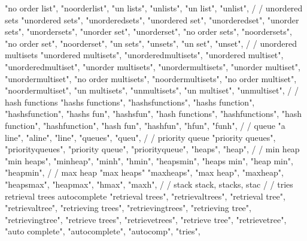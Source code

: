         "no order list", 
        "noorderlist", 
        "un lists", 
        "unlists", 
        "un list", 
        "unlist", 
        /
        / unordered sets
        "unordered sets", 
        "unorderedsets", 
        "unordered set", 
        "unorderedset", 
        "unorder sets", 
        "unordersets", 
        "unorder set", 
        "unorderset", 
        "no order sets", 
        "noordersets", 
        "no order set", 
        "noorderset", 
        "un sets", 
        "unsets", 
        "un set", 
        "unset", 
        /
        / unordered multisets
        "unordered multisets", 
        "unorderedmultisets", 
        "unordered multiset", 
        "unorderedmultiset", 
        "unorder multisets", 
        "unordermultisets", 
        "unorder multiset", 
        "unordermultiset", 
        "no order multisets", 
        "noordermultisets", 
        "no order multiset", 
        "noordermultiset", 
        "un multisets", 
        "unmultisets", 
        "un multiset", 
        "unmultiset", 
        /
        / hash functions
        "hashs functions",  
        "hashsfunctions",  
        "hashs function",  
        "hashsfunction",  
        "hashs fun",  
        "hashsfun",  
        "hash functions",  
        "hashfunctions",  
        "hash function",  
        "hashfunction",  
        "hash fun",  
        "hashfun",  
        "hfun",  
        "funh",  
        /
        / queue 
        "a line",
        "aline",
        "line",
        "queues",
        "queu",
        /
        / priority queue 
        "priority queues",  
        "priorityqueues",  
        "priority queue",  
        "priorityqueue",  
        "heaps",  
        "heap",  
        /
        / min heap 
        "min heaps",
        "minheap", 
        "minh", 
        "hmin",
        "heapsmin",
        "heaps min",
        "heap min",
        "heapmin",
        /
        / max heap
        "max heaps"
        "maxheaps",
        "max heap",
        "maxheap", 
        "heapsmax",
        "heapmax", 
        "hmax",
        "maxh",
        /
        / stack
        stack, stacks, stac
        /
        / tries retrieval trees autocomplete 
        "retrieval trees",  
        "retrievaltrees",  
        "retrieval tree",  
        "retrievaltree",  
        "retrieving trees",  
        "retrievingtrees",  
        "retrieving tree",  
        "retrievingtree",  
        "retrieve trees",  
        "retrievetrees",  
        "retrieve tree",  
        "retrievetree",  
        "auto complete",  
        "autocomplete",  
        "autocomp",  
        "tries",  

